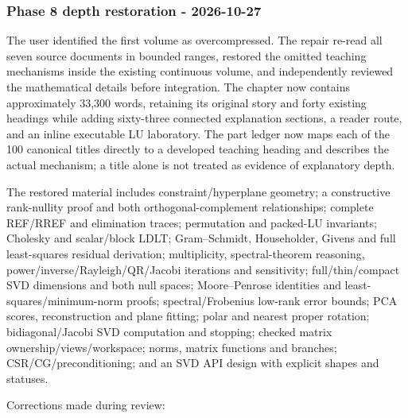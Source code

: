 \subsubsection{Phase 8 depth restoration - 2026-10-27}\label{appendix-a103e7846d21-phase-8-depth-restoration---2026-10-27}

The user identified the first volume as overcompressed. The repair re-read all seven source documents in bounded ranges, restored the omitted teaching mechanisms inside the existing continuous volume, and independently reviewed the mathematical details before integration. The chapter now contains approximately 33,300 words, retaining its original story and forty existing headings while adding sixty-three connected explanation sections, a reader route, and an inline executable LU laboratory. The part ledger now maps each of the 100 canonical titles directly to a developed teaching heading and describes the actual mechanism; a title alone is not treated as evidence of explanatory depth.

The restored material includes constraint/hyperplane geometry; a constructive rank-nullity proof and both orthogonal-complement relationships; complete REF/RREF and elimination traces; permutation and packed-LU invariants; Cholesky and scalar/block LDLT; Gram--Schmidt, Householder, Givens and full least-squares residual derivation; multiplicity, spectral-theorem reasoning, power/inverse/Rayleigh/QR/Jacobi iterations and sensitivity; full/thin/compact SVD dimensions and both null spaces; Moore--Penrose identities and least-squares/minimum-norm proofs; spectral/Frobenius low-rank error bounds; PCA scores, reconstruction and plane fitting; polar and nearest proper rotation; bidiagonal/Jacobi SVD computation and stopping; checked matrix ownership/views/workspace; norms, matrix functions and branches; CSR/CG/preconditioning; and an SVD API design with explicit shapes and statuses.

Corrections made during review:

